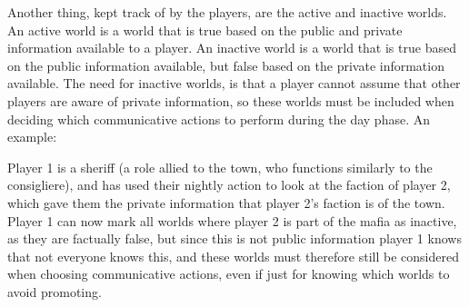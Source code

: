 Another thing, kept track of by the players, are the active and inactive
worlds. An active world is a world that is true based on the public and private
information available to a player. An inactive world is a world that is true
based on the public information available, but false based on the private
information available. The need for inactive worlds, is that a player cannot
assume that other players are aware of private information, so these worlds
must be included when deciding which communicative actions to perform during
the day phase. An example:

Player 1 is a sheriff (a role allied to the town, who functions similarly to
the consigliere), and has used their nightly action to look at the faction of
player 2, which gave them the private information that player 2's faction is of
the town. Player 1 can now mark all worlds where player 2 is part of the mafia
as inactive, as they are factually false, but since this is not public
information player 1 knows that not everyone knows this, and these worlds must
therefore still be considered when choosing communicative actions, even if just
for knowing which worlds to avoid promoting.
